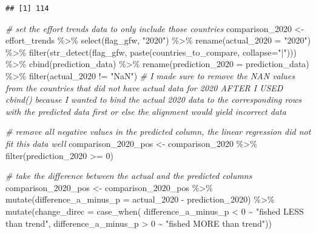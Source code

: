\documentclass[
]{article}
\newenvironment{Shaded}{\begin{snugshade}}{\end{snugshade}}
\newcommand{\AttributeTok}[1]{\textcolor[rgb]{0.77,0.63,0.00}{#1}}
\newcommand{\CommentTok}[1]{\textcolor[rgb]{0.56,0.35,0.01}{\textit{#1}}}
\newcommand{\DecValTok}[1]{\textcolor[rgb]{0.00,0.00,0.81}{#1}}
\newcommand{\FunctionTok}[1]{\textcolor[rgb]{0.00,0.00,0.00}{#1}}
\newcommand{\NormalTok}[1]{#1}
\newcommand{\OtherTok}[1]{\textcolor[rgb]{0.56,0.35,0.01}{#1}}
\newcommand{\SpecialCharTok}[1]{\textcolor[rgb]{0.00,0.00,0.00}{#1}}
\newcommand{\StringTok}[1]{\textcolor[rgb]{0.31,0.60,0.02}{#1}}
\begin{document}
\begin{verbatim}
## [1] 114
\end{verbatim}

\begin{Shaded}
\begin{Highlighting}[]
\CommentTok{\# set the effort trends data to only include those countries}
\NormalTok{comparison\_2020 }\OtherTok{\textless{}{-}}\NormalTok{ effort\_trends }\SpecialCharTok{\%\textgreater{}\%} 
  \FunctionTok{select}\NormalTok{(flag\_gfw, }\StringTok{"2020"}\NormalTok{) }\SpecialCharTok{\%\textgreater{}\%}
  \FunctionTok{rename}\NormalTok{(}\AttributeTok{actual\_2020 =} \StringTok{"2020"}\NormalTok{) }\SpecialCharTok{\%\textgreater{}\%} 
  \FunctionTok{filter}\NormalTok{(}\FunctionTok{str\_detect}\NormalTok{(flag\_gfw, }\FunctionTok{paste}\NormalTok{(countries\_to\_compare, }\AttributeTok{collapse=}\StringTok{"|"}\NormalTok{))) }\SpecialCharTok{\%\textgreater{}\%} 
  \FunctionTok{cbind}\NormalTok{(prediction\_data) }\SpecialCharTok{\%\textgreater{}\%} 
  \FunctionTok{rename}\NormalTok{(}\AttributeTok{prediction\_2020 =}\NormalTok{ prediction\_data) }\SpecialCharTok{\%\textgreater{}\%} 
  \FunctionTok{filter}\NormalTok{(actual\_2020 }\SpecialCharTok{!=} \StringTok{"NaN"}\NormalTok{)}
\CommentTok{\# I made sure to remove the NAN values from the countries that did not have actual data for 2020 AFTER I USED cbind() because I wanted to bind the actual 2020 data to the corresponding rows with the predicted data first or else the alignment would yield incorrect data}

\CommentTok{\# remove all negative values in the predicted column, the linear regression did not fit this data well}
\NormalTok{comparison\_2020\_pos }\OtherTok{\textless{}{-}}\NormalTok{ comparison\_2020 }\SpecialCharTok{\%\textgreater{}\%} 
  \FunctionTok{filter}\NormalTok{(prediction\_2020 }\SpecialCharTok{\textgreater{}=} \DecValTok{0}\NormalTok{)}

\CommentTok{\# take the difference between the actual and the predicted columns}
\NormalTok{comparison\_2020\_pos }\OtherTok{\textless{}{-}}\NormalTok{ comparison\_2020\_pos }\SpecialCharTok{\%\textgreater{}\%} 
  \FunctionTok{mutate}\NormalTok{(}\AttributeTok{difference\_a\_minus\_p =}\NormalTok{ actual\_2020 }\SpecialCharTok{{-}}\NormalTok{ prediction\_2020) }\SpecialCharTok{\%\textgreater{}\%} 
  \FunctionTok{mutate}\NormalTok{(}\AttributeTok{change\_direc =} \FunctionTok{case\_when}\NormalTok{(}
\NormalTok{    difference\_a\_minus\_p }\SpecialCharTok{\textless{}} \DecValTok{0} \SpecialCharTok{\textasciitilde{}} \StringTok{"fished LESS than trend"}\NormalTok{,}
\NormalTok{    difference\_a\_minus\_p }\SpecialCharTok{\textgreater{}} \DecValTok{0} \SpecialCharTok{\textasciitilde{}} \StringTok{"fished MORE than trend"}\NormalTok{))}
\end{Highlighting}
\end{Shaded}
\end{document}
